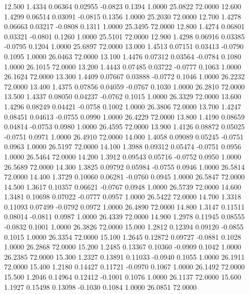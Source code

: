  12.500   1.4334   0.06364   0.02955  -0.0823   0.1394   1.0000  25.0822  72.0000
  12.600   1.4299   0.06514   0.03091  -0.0815   0.1356   1.0000  25.2030  72.0000
  12.700   1.4278   0.06663   0.03217  -0.0808   0.1311   1.0000  25.3495  72.0000
  12.800   1.4274   0.06801   0.03321  -0.0801   0.1260   1.0000  25.5101  72.0000
  12.900   1.4298   0.06916   0.03385  -0.0795   0.1204   1.0000  25.6897  72.0000
  13.000   1.4513   0.07151   0.03413  -0.0790   0.1095   1.0000  26.0463  72.0000
  13.100   1.4476   0.07312   0.03564  -0.0784   0.1080   1.0000  26.1015  72.0000
  13.200   1.4443   0.07485   0.03722  -0.0777   0.1063   1.0000  26.1624  72.0000
  13.300   1.4409   0.07667   0.03888  -0.0772   0.1046   1.0000  26.2232  72.0000
  13.400   1.4375   0.07856   0.04059  -0.0767   0.1030   1.0000  26.2810  72.0000
  13.500   1.4337   0.08050   0.04237  -0.0762   0.1015   1.0000  26.3329  72.0000
  13.600   1.4296   0.08249   0.04421  -0.0758   0.1002   1.0000  26.3806  72.0000
  13.700   1.4247   0.08451   0.04613  -0.0755   0.0990   1.0000  26.4229  72.0000
  13.800   1.4190   0.08659   0.04814  -0.0753   0.0980   1.0000  26.4595  72.0000
  13.900   1.4126   0.08872   0.05025  -0.0751   0.0971   1.0000  26.4910  72.0000
  14.000   1.4058   0.09089   0.05245  -0.0751   0.0963   1.0000  26.5197  72.0000
  14.100   1.3988   0.09312   0.05474  -0.0751   0.0956   1.0000  26.5464  72.0000
  14.200   1.3912   0.09543   0.05716  -0.0752   0.0950   1.0000  26.5689  72.0000
  14.300   1.3825   0.09792   0.05984  -0.0755   0.0946   1.0000  26.5814  72.0000
  14.400   1.3729   0.10060   0.06281  -0.0760   0.0945   1.0000  26.5847  72.0000
  14.500   1.3617   0.10357   0.06621  -0.0767   0.0948   1.0000  26.5739  72.0000
  14.600   1.3481   0.10698   0.07022  -0.0777   0.0957   1.0000  26.5422  72.0000
  14.700   1.3318   0.11093   0.07499  -0.0792   0.0972   1.0000  26.4890  72.0000
  14.800   1.3147   0.11511   0.08014  -0.0811   0.0987   1.0000  26.4339  72.0000
  14.900   1.2978   0.11945   0.08555  -0.0832   0.1001   1.0000  26.3826  72.0000
  15.000   1.2812   0.12394   0.09120  -0.0855   0.1015   1.0000  26.3354  72.0000
  15.100   1.2645   0.12872   0.09727  -0.0881   0.1028   1.0000  26.2868  72.0000
  15.200   1.2485   0.13367   0.10360  -0.0909   0.1042   1.0000  26.2385  72.0000
  15.300   1.2327   0.13891   0.11033  -0.0940   0.1055   1.0000  26.1911  72.0000
  15.400   1.2180   0.14427   0.11721  -0.0970   0.1067   1.0000  26.1492  72.0000
  15.500   1.2046   0.14964   0.12412  -0.1001   0.1076   1.0000  26.1137  72.0000
  15.600   1.1927   0.15498   0.13098  -0.1030   0.1084   1.0000  26.0851  72.0000
